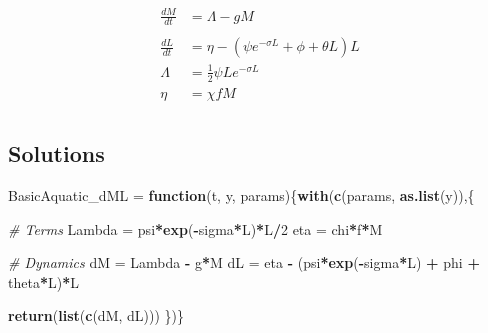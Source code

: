\documentclass[
]{book}
\newenvironment{Shaded}{\begin{snugshade}}{\end{snugshade}}
\newcommand{\CommentTok}[1]{\textcolor[rgb]{0.56,0.35,0.01}{\textit{#1}}}
\newcommand{\ControlFlowTok}[1]{\textcolor[rgb]{0.13,0.29,0.53}{\textbf{#1}}}
\newcommand{\DecValTok}[1]{\textcolor[rgb]{0.00,0.00,0.81}{#1}}
\newcommand{\FunctionTok}[1]{\textcolor[rgb]{0.13,0.29,0.53}{\textbf{#1}}}
\newcommand{\NormalTok}[1]{#1}
\newcommand{\OtherTok}[1]{\textcolor[rgb]{0.56,0.35,0.01}{#1}}
\newcommand{\SpecialCharTok}[1]{\textcolor[rgb]{0.81,0.36,0.00}{\textbf{#1}}}
\begin{document}
\begin{equation}
\begin{array}{rl}
\frac{dM}{dt} &= \Lambda - g M\\  \\ \hline 
\frac{dL}{dt} &= \eta - (\psi e^{-\sigma L} + \phi + \theta L) L \\ 
\Lambda &= \frac{1}{2} \psi L e^{-\sigma L}\\ 
\eta &= \chi f M \\ 
\end{array}
\end{equation}

\hypertarget{solutions-1}{%
\subsection{Solutions}\label{solutions-1}}

\begin{Shaded}
\begin{Highlighting}[]
\NormalTok{BasicAquatic\_dML }\OtherTok{=} \ControlFlowTok{function}\NormalTok{(t, y, params)\{}\FunctionTok{with}\NormalTok{(}\FunctionTok{c}\NormalTok{(params, }\FunctionTok{as.list}\NormalTok{(y)),\{}
   
  \CommentTok{\# Terms }
\NormalTok{  Lambda }\OtherTok{=}\NormalTok{ psi}\SpecialCharTok{*}\FunctionTok{exp}\NormalTok{(}\SpecialCharTok{{-}}\NormalTok{sigma}\SpecialCharTok{*}\NormalTok{L)}\SpecialCharTok{*}\NormalTok{L}\SpecialCharTok{/}\DecValTok{2} 
\NormalTok{  eta }\OtherTok{=}\NormalTok{ chi}\SpecialCharTok{*}\NormalTok{f}\SpecialCharTok{*}\NormalTok{M }
   
  \CommentTok{\# Dynamics }
\NormalTok{  dM }\OtherTok{=}\NormalTok{ Lambda }\SpecialCharTok{{-}}\NormalTok{ g}\SpecialCharTok{*}\NormalTok{M}
\NormalTok{  dL }\OtherTok{=}\NormalTok{ eta }\SpecialCharTok{{-}}\NormalTok{ (psi}\SpecialCharTok{*}\FunctionTok{exp}\NormalTok{(}\SpecialCharTok{{-}}\NormalTok{sigma}\SpecialCharTok{*}\NormalTok{L) }\SpecialCharTok{+}\NormalTok{ phi }\SpecialCharTok{+}\NormalTok{ theta}\SpecialCharTok{*}\NormalTok{L)}\SpecialCharTok{*}\NormalTok{L }
  
  \FunctionTok{return}\NormalTok{(}\FunctionTok{list}\NormalTok{(}\FunctionTok{c}\NormalTok{(dM, dL)))}
\NormalTok{\})\} }
\end{Highlighting}
\end{Shaded}
\end{document}
